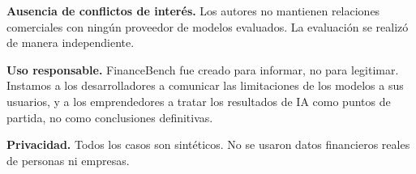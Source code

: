 \documentclass[12pt,a4paper]{article}
\begin{document}
\textbf{Ausencia de conflictos de interés.} Los autores no mantienen relaciones comerciales con ningún proveedor de modelos evaluados. La evaluación se realizó de manera independiente.

\textbf{Uso responsable.} FinanceBench fue creado para informar, no para legitimar. Instamos a los desarrolladores a comunicar las limitaciones de los modelos a sus usuarios, y a los emprendedores a tratar los resultados de IA como puntos de partida, no como conclusiones definitivas.

\textbf{Privacidad.} Todos los casos son sintéticos. No se usaron datos financieros reales de personas ni empresas.


\end{document}
